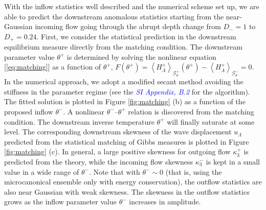 \documentclass[9pt,twocolumn,twoside,lineno]{pnas-new}
\begin{document}
With the inflow statistics well described and the numerical scheme
set up, we are able to predict the downstream anomalous statistics
starting from the near-Gaussian incoming flow going through the abrupt
depth change from $D_{-}=1$ to $D_{+}=0.24$. First, we consider
the statistical prediction in the downstream equilibrium measure directly
from the matching condition. The downstream parameter value $\theta^{+}$
is determined by solving the nonlinear equation [\ref{eq:matching}]
as a function of $\theta^{+}$, $F\left(\theta^{+}\right)=\left\langle H_{\Lambda}^{+}\right\rangle _{\mathcal{G}_{\theta}^{+}}\left(\theta^{+}\right)-\left\langle H_{\Lambda}^{+}\right\rangle _{\mathcal{G}_{\theta}^{-}}=0$.
In the numerical approach, we adopt a modified secant method avoiding
the stiffness in the parameter regime (see the \textcolor{blue}{\emph{SI Appendix, B.2}}
for the algorithm). The fitted solution is plotted in Figure
\ref{fig:matching} (b) as a function of the proposed inflow $\theta^{-}$.
A nonlinear $\theta^{-}$--$\theta^{+}$ relation is discovered from
the matching condition. The downstream inverse temperature $\theta^{+}$
will finally saturate at some level. The corresponding downstream
skewness of the wave displacement $u_{\Lambda}$ predicted from the
statistical matching of Gibbs measures is plotted in Figure \ref{fig:matching} (c). In general, a large positive skewness
for outgoing flow $\kappa_3^{+}$ is predicted from the theory, while
the incoming flow skewness $\kappa_3^{-}$ is kept in a small value
in a wide range of $\theta^{-}$. Note that with $\theta^{-}\sim0$
(that is, using the microcanonical ensemble only with energy conservation),
the outflow statistics are also near Gaussian with weak skewness.
The skewness in the outflow statistics grows as the inflow parameter
value $\theta^{-}$ increases in amplitude. 
\end{document}

